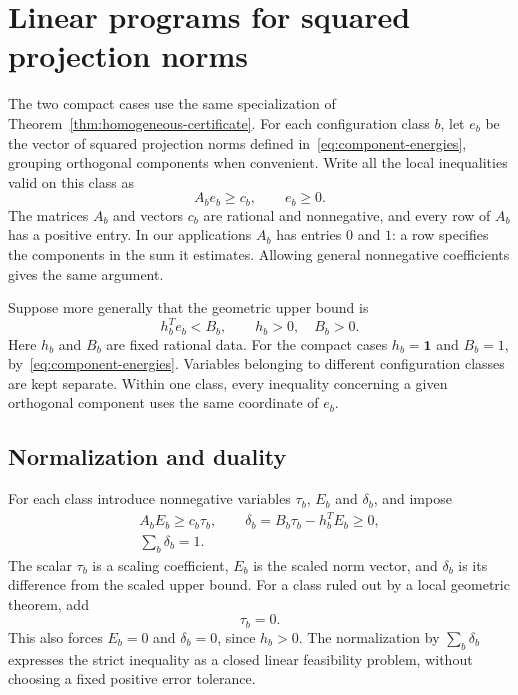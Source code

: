 \documentclass[11pt]{article}
\theoremstyle{definition}
\theoremstyle{remark}
\numberwithin{equation}{section}
\newcommand{\one}{\mathbf 1}
\begin{document}
\section{Linear programs for squared projection norms}
\label{sec:energy-framework}

The two compact cases use the same specialization of
Theorem~\ref{thm:homogeneous-certificate}. For each configuration
class $b$, let $e_b$ be the vector of squared projection norms defined
in~\eqref{eq:component-energies}, grouping orthogonal components
when convenient. Write all the local inequalities valid on this
class as
\begin{equation}\label{eq:branch-energy}
                  A_be_b\ge c_b,\qquad e_b\ge0.
\end{equation}
The matrices $A_b$ and vectors $c_b$ are rational and nonnegative,
and every row of $A_b$ has a positive entry. In our applications
$A_b$ has entries $0$ and $1$: a row specifies the components in the
sum it estimates. Allowing general nonnegative coefficients gives
the same argument.

Suppose more generally that the geometric upper bound is
\begin{equation}\label{eq:general-energy-budget}
              h_b^Te_b<B_b,\qquad h_b>0,\quad B_b>0.
\end{equation}
Here $h_b$ and $B_b$ are fixed rational data. For the compact cases
$h_b=\one$ and $B_b=1$, by~\eqref{eq:component-energies}.
Variables belonging to different configuration classes are kept
separate. Within one class, every inequality concerning a given
orthogonal component uses the same coordinate of $e_b$.

\subsection{Normalization and duality}

For each class introduce nonnegative variables $\tau_b$, $E_b$ and
$\delta_b$, and impose
\begin{equation}\label{eq:budget-deficit}
 \begin{gathered}
 A_bE_b\ge c_b\tau_b,\qquad
 \delta_b=B_b\tau_b-h_b^TE_b\ge0,\\
                         \sum_b\delta_b=1.
 \end{gathered}
\end{equation}
The scalar $\tau_b$ is a scaling coefficient, $E_b$ is the scaled
norm vector, and $\delta_b$ is its difference from the scaled upper
bound. For a class ruled out by a local geometric theorem, add
\begin{equation}\label{eq:excluded-mass}
                              \tau_b=0.
\end{equation}
This also forces $E_b=0$ and $\delta_b=0$, since $h_b>0$.
The normalization by $\sum_b\delta_b$ expresses the strict
inequality as a closed linear feasibility problem, without choosing
a fixed positive error tolerance.
\end{document}
